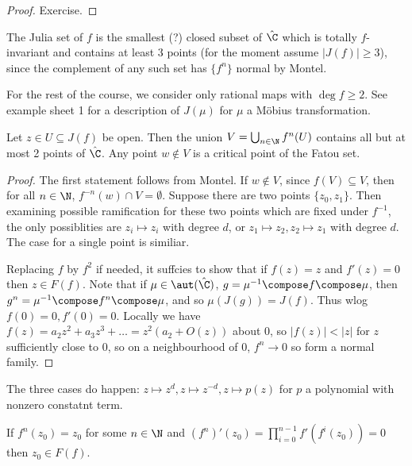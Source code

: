 \documentclass[a4paper]{article}
\begin{document}
\begin{proof}
  Exercise.
\end{proof}

\begin{remark}
  The Julia set of \(f\) is the smallest (?) closed subset of \(\hat \C\) which is totally \(f\)-invariant and contains at least \(3\) points (for the moment assume \(|J(f)| \geq 3\)), since the complement of any such set has \(\{f^n\}\) normal by Montel.
\end{remark}

For the rest of the course, we consider only rational maps with \(\deg f \geq 2\). See example sheet 1 for a description of \(J(\mu)\) for \(\mu\) a Möbius transformation.

\begin{theorem}
  Let \(z \in U \subseteq J(f)\) be open. Then the union \(V = \bigcup_{n \in \N} f^n(U)\) contains all but at most 2 points of \(\hat \C\). Any point \(w \notin V\) is a critical point of the Fatou set.
\end{theorem}

\begin{proof}
  The first statement follows from Montel. If \(w \notin V\), since \(f(V) \subseteq V\), then for all \(n \in \N\), \(f^{-n}(w) \cap V = \emptyset\). Suppose there are two points \(\{z_0, z_1\}\). Then examining possible ramification for these two points which are fixed under \(f^{-1}\), the only possiblities are \(z_i \mapsto z_i\) with degree \(d\), or \(z_1 \mapsto z_2, z_2 \mapsto z_1\) with degree \(d\). The case for a single point is similiar.

  Replacing \(f\) by \(f^2\) if needed, it suffcies to show that if \(f(z) = z\) and \(f'(z) = 0\) then \(z \in F(f)\). Note that if \(\mu \in \aut(\hat \C)\), \(g = \mu^{-1} \compose f \compose \mu\), then \(g^n = \mu^{-1} \compose f^n \compose \mu\), and so \(\mu(J(g)) = J(f)\). Thus wlog \(f(0) = 0, f'(0) = 0\). Locally we have \(f(z) = a_2 z^2 + a_3z^3 + \dots = z^2(a_2 + O(z))\) about \(0\), so \(|f(z)| < |z|\) for \(z\) sufficiently close to \(0\), so on a neighbourhood of \(0\), \(f^n \to 0\) so form a normal family.
\end{proof}

The three cases do happen: \(z \mapsto z^d, z \mapsto z^{-d}, z \mapsto p(z)\) for \(p\) a polynomial with nonzero constatnt term.

\begin{remark}
  If \(f^n(z_0) = z_0\) for some \(n \in \N\) and \((f^n)'(z_0) = \prod_{i = 0}^{n - 1} f'(f^i(z_0)) = 0\) then \(z_0 \in F(f)\).
\end{remark}
\end{document}
